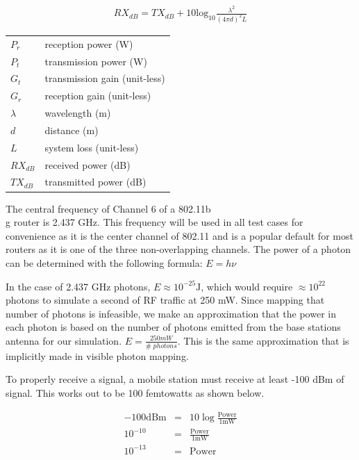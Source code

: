 \documentclass[%
        final,
        notitlepage,
        narroweqnarray,
        inline,
        twoside,
        ]{ieee}
\begin{document}
\begin{eqnarray}
RX_{dB} = TX_{dB} + 10\mathrm{log_{10}} \frac{\lambda^2}{(4 \pi d)^2 L}
\end{eqnarray}

\vspace{5mm}
\begin{tabular}{|l|l|}
\hline
$ P_r$ & reception power (W) \\
$ P_t$ & transmission power (W) \\
$ G_t$ & transmission gain (unit-less) \\
$ G_r$ & reception gain (unit-less) \\
$ \lambda$ & wavelength (m) \\
$ d$ & distance (m) \\
$ L$ & system loss (unit-less) \\
$ RX_{dB}$ & received power (dB) \\
$ TX_{dB}$ & transmitted power (dB) \\
\hline
\end{tabular}
\vspace{5mm}

The central frequency of Channel 6 of a 802.11b\\g router is 2.437 GHz. This frequency
will be used in all test cases for convenience as it is the center channel of 802.11 and
is a popular default for most routers as it is one of the three non-overlapping channels. 
The power of a photon can be determined with the following formula: $E = h\nu$

In the case of 2.437 GHz photons, $E \approx 10^{-25} \mathrm{J}$, which would require $\approx 10^{22}$
photons to simulate a second of RF traffic at 250 mW. Since mapping that number of photons is infeasible, 
we make an approximation that the power in each photon is based on the number of photons emitted from the base 
stations antenna for our simulation. $E = \frac{250mW}{\#\;photons}$. This is the same approximation that is
implicitly made in visible photon mapping.

To properly receive a signal, a mobile station must receive at least -100 dBm of signal. 
This works out to be 100 femtowatts as shown below.

\begin{eqnarray}
	-100 \mathrm{dBm} & = & 10\log\frac{\mathrm{Power}}{1\mathrm{mW}} \\
	10^{-10} & = & \frac{\mathrm{Power}}{1\mathrm{mW}} \\
	10^{-13} & = & \mathrm{Power}
\end{eqnarray}
\end{document}
